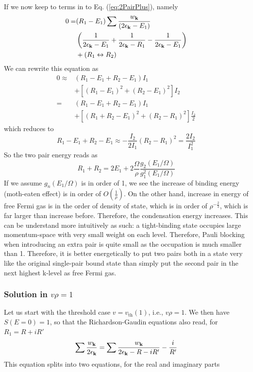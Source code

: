 \documentclass[aps,prb,showpacs,reprint]{revtex4-1}
\begin{document}
If we now keep to terms in to Eq. (\ref{eq:2PairPlus}), namely
\begin{equation}
\begin{split}
0=&(R_1-E_1)\sum{\frac{w_{\ensuremath{\mathbf{k}}}}{(2\epsilon_{\ensuremath{\mathbf{k}}}-E_1)}}\\
&\left(\frac{1}{2\epsilon_{\mathbf{k}}-E_1}+\frac{1}{2\epsilon_{\mathbf{k}}-R_1}-\frac{1}{2\epsilon_{\mathbf{k}}-E_1}\right)\\
&+(R_1\leftrightarrow{}R_2)
\end{split}
\end{equation}
We can rewrite this equation as
\begin{equation}
\begin{split}
0\approx&(R_1-E_1+R_2-E_1)I_1\\
&+\left[(R_1-E_1)^2+(R_2-E_1)^2\right]I_2\\
=&(R_1-E_1+R_2-E_1)I_1\\
&+\left[(R_1+R_2-E_1)^2+(R_2-R_1)^2\right]\frac{I_2}{2}
\end{split}
\label{eq:I12}
\end{equation}
which reduces  to 
\begin{equation}
R_1-E_1+R_2-E_1\approx-\frac{I_2}{2I_1}(R_2-R_1)^2=\frac{2I_2}{I_1^2}
\label{eq:}
\end{equation}
So the two pair energy reads as
\begin{equation}
R_1+R_2=2E_1+2\frac{\Omega}{\rho}\frac{g_2(E_1/\Omega)}{g_1^2(E_1/\Omega)}
\label{eq:}
\end{equation}
If we assume $g_n(E_1/\Omega)$ is in order of 1, we see the increase of binding energy (moth-eaten effect) is in order of $O(\frac{1}{\rho})$.  On the other hand, increase in energy of free Fermi gas is in the order of density of state, which is in order of $\rho^{-\frac{2}{3}}$, which is far larger than increase before.  Therefore, the condensation energy increases. This can be understand more intuitively as such: a tight-binding state occupies large momentum-space with very small weight on each level. Therefore, Pauli blocking when introducing an extra pair is quite small as the occupation is much smaller than 1. Therefore, it is better energetically to put two pairs both in a state very like the original single-pair bound state than simply put the second pair in the next highest k-level as free Fermi gas.   
\subsubsection{Solution in $v\rho=1$}
Let us start with the threshold case $v=v_{\text{th}}(1)$, i.e., $v\rho=1$.  We then have $S(E=0)=1$, so that the Richardson-Gaudin equations also read, for $R_1=R+iR'$
\begin{equation}
\sum\frac{w_{\mathbf{k}}}{2\epsilon_{\mathbf{k}}}=\sum\frac{w_{\mathbf{k}}}{2\epsilon_{\mathbf{k}}-R-iR'}-\frac{i}{R'}
\label{eq:}
\end{equation}
This equation splits into two equations, for the real and imaginary parts
\end{document}
